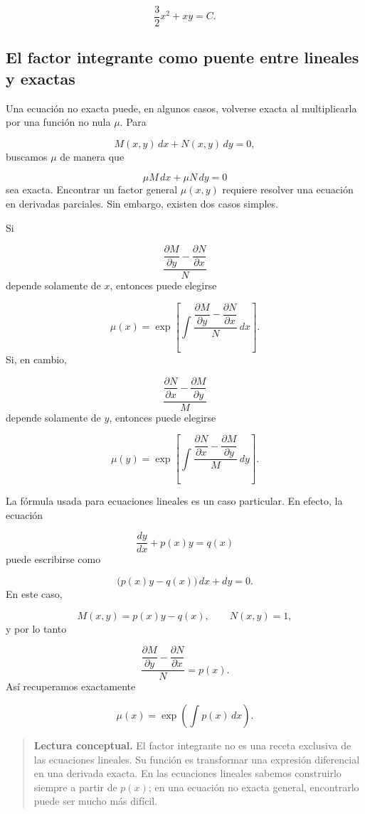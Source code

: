 \documentclass[12pt,a4paper]{article}
\begin{document}
	\[
	\boxed{\frac32x^2+xy=C.}
	\]

	\clearpage
	\subsection{El factor integrante como puente entre lineales y exactas}

	Una ecuación no exacta puede, en algunos casos, volverse exacta al multiplicarla por una función no nula \(\mu\). Para

	\[
	M(x,y)\,dx+N(x,y)\,dy=0,
	\]
	buscamos \(\mu\) de manera que

	\[
	\mu M\,dx+\mu N\,dy=0
	\]
	sea exacta. Encontrar un factor general \(\mu(x,y)\) requiere resolver una ecuación en derivadas parciales. Sin embargo, existen dos casos simples.

	Si

	\[
	\frac{\dfrac{\partial M}{\partial y}-\dfrac{\partial N}{\partial x}}{N}
	\]
	depende solamente de \(x\), entonces puede elegirse

	\[
	\boxed{
	\mu(x)
	=
	\exp\left[
	\int
	\frac{\dfrac{\partial M}{\partial y}-\dfrac{\partial N}{\partial x}}{N}
	\,dx
	\right].
	}
	\]
	Si, en cambio,

	\[
	\frac{\dfrac{\partial N}{\partial x}-\dfrac{\partial M}{\partial y}}{M}
	\]
	depende solamente de \(y\), entonces puede elegirse

	\[
	\boxed{
	\mu(y)
	=
	\exp\left[
	\int
	\frac{\dfrac{\partial N}{\partial x}-\dfrac{\partial M}{\partial y}}{M}
	\,dy
	\right].
	}
	\]

	La fórmula usada para ecuaciones lineales es un caso particular. En efecto, la ecuación

	\[
	\frac{dy}{dx}+p(x)y=q(x)
	\]
	puede escribirse como

	\[
	\bigl(p(x)y-q(x)\bigr)\,dx+dy=0.
	\]
	En este caso,

	\[
	M(x,y)=p(x)y-q(x),
	\qquad
	N(x,y)=1,
	\]
	y por lo tanto

	\[
	\frac{\dfrac{\partial M}{\partial y}-\dfrac{\partial N}{\partial x}}{N}
	=
	p(x).
	\]
	Así recuperamos exactamente

	\[
	\mu(x)=\exp\left(\int p(x)\,dx\right).
	\]

	\begin{quote}
		\textbf{Lectura conceptual.} El factor integrante no es una receta exclusiva de las ecuaciones lineales. Su función es transformar una expresión diferencial en una derivada exacta. En las ecuaciones lineales sabemos construirlo siempre a partir de \(p(x)\); en una ecuación no exacta general, encontrarlo puede ser mucho más difícil.
	\end{quote}
\end{document}
